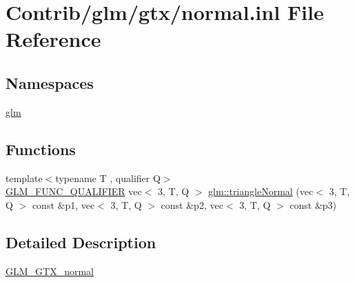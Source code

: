 \hypertarget{normal_8inl}{}\section{Contrib/glm/gtx/normal.inl File Reference}
\label{normal_8inl}
\subsection*{Namespaces}
\begin{DoxyCompactItemize}
\item 
 \mbox{\hyperlink{namespaceglm}{glm}}
\end{DoxyCompactItemize}
\subsection*{Functions}
\begin{DoxyCompactItemize}
\item 
{\footnotesize template$<$typename T , qualifier Q$>$ }\\\mbox{\hyperlink{setup_8hpp_a33fdea6f91c5f834105f7415e2a64407}{G\+L\+M\+\_\+\+F\+U\+N\+C\+\_\+\+Q\+U\+A\+L\+I\+F\+I\+ER}} vec$<$ 3, T, Q $>$ \mbox{\hyperlink{group__gtx__normal_gaff1cb5496925dfa7962df457772a7f35}{glm\+::triangle\+Normal}} (vec$<$ 3, T, Q $>$ const \&p1, vec$<$ 3, T, Q $>$ const \&p2, vec$<$ 3, T, Q $>$ const \&p3)
\end{DoxyCompactItemize}


\subsection{Detailed Description}
\mbox{\hyperlink{group__gtx__normal}{G\+L\+M\+\_\+\+G\+T\+X\+\_\+normal}} 
